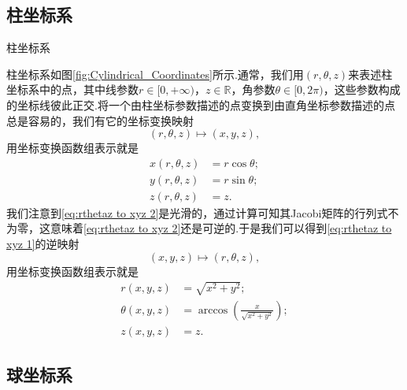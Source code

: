 	\subsection{柱坐标系}
	\begin{marginfigure}
		\centering
		
		\caption{柱坐标系}\label{fig:Cylindrical_Coordinates}
	\end{marginfigure}
	柱坐标系如图\ref{fig:Cylindrical_Coordinates}所示.通常，我们用$(r,\theta,z)$来表述柱坐标系中的点，其中线参数$r\in[0,+\infty)$，$z\in \mathbb{R}$，角参数$\theta\in[0,2\pi)$，这些参数构成的坐标线彼此正交.将一个由柱坐标参数描述的点变换到由直角坐标参数描述的点总是容易的，我们有它的坐标变换映射
	\begin{equation}\label{eq:rthetaz to xyz 1}
		(r,\theta,z)\mapsto(x,y,z),
	\end{equation}
	用坐标变换函数组表示就是
	\begin{equation}\label{eq:rthetaz to xyz 2}
		\begin{split}
			x(r,\theta,z)&=r\cos\theta;\\
			y(r,\theta,z)&=r\sin\theta;\\
			z(r,\theta,z)&=z.
		\end{split}
	\end{equation}
	我们注意到\ref{eq:rthetaz to xyz 2}是光滑的，通过计算可知其Jacobi矩阵的行列式不为零，这意味着\ref{eq:rthetaz to xyz 2}还是可逆的.于是我们可以得到\ref{eq:rthetaz to xyz 1}的逆映射
	\begin{equation}\label{eq:xyz to rthetaz 1}
		(x,y,z)\mapsto(r,\theta,z),
	\end{equation}
	用坐标变换函数组表示就是
	\begin{equation}\label{eq:xyz to rthetaz 2}
		\begin{split}
			r(x,y,z)&=\sqrt{x^2+y^2};\\
			\theta(x,y,z)&=\arccos\left(\frac{x}{\sqrt{x^2+y^2}}\right);\\
			z(x,y,z)&=z.
		\end{split}
	\end{equation}
		
\subsection{球坐标系}
		
